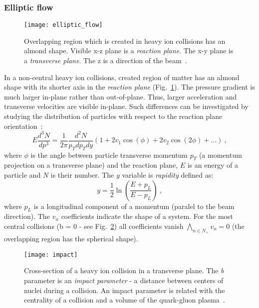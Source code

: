       \subsubsection{Elliptic flow}
        \begin{figure}[b]
          \centering
          \texttt{[image: elliptic\_flow]}
          \caption{Overlapping region which is created in heavy ion collisions has an almond shape. Visible x-z plane is a \textit{reaction plane}. The x-y plane is a \textit{transverse plane}. The z is a direction of the beam~\cite{eflow}.}
          \label{fig:elliptic_flow}
        \end{figure}
        In a non-central heavy ion collisions, created region of matter has an almond shape with its shorter axis in the \textit{reaction plane} (Fig.~\ref{fig:elliptic_flow}).
        The pressure gradient is much larger in-plane rather than out-of-plane.
        Thus, larger acceleration and transverse velocities are visible in-plane.
        Such differences can be investigated by studying the distribution of particles with respect to the reaction plane orientation~\cite{hip}:
        \begin{equation}
          E\frac{d^3 N}{d p^3} = \frac{1}{2\pi} \frac{d^2 N}{p_T d p_T d y} (1 + 2 v_1 \cos(\phi) + 2 v_2 \cos(2 \phi) + ...)~,
          \label{eq:elliptic_flow}
        \end{equation}
        where $\phi$ is the angle between particle transverse momentum $p_T$ (a momentum projection on a transverse plane) and the reaction plane, $E$ is an energy of a particle and $N$ is their number.
        The $y$ variable is \textit{rapidity} defined as:
        \begin{equation}
          y = \frac{1}{2} \ln \left( \frac{E+ p_L}{E - p_L} \right)~,
        \end{equation}
        where $p_L$ is a longitudinal component of a momentum (paralel to the beam direction).
        The $v_n$ coefficients indicate the shape of a system.
        For the most central collisions (b = 0 - see Fig.~\ref{fig:impact_parameter}) all coefficients vanish $\bigwedge_{n \in N_{+}} v_n = 0$ (the overlapping region has the spherical shape).
        \begin{figure}[b]
          \centering
          \texttt{[image: impact]}
          \caption{Cross-section of a heavy ion collision in a transverse plane. 
          The \textit{b} parameter is an \textit{impact parameter} - a distance between centers of nuclei during a collision. An impact parameter is related with the centrality of a collision and a volume of the quark-gluon plasma~\cite{hip}.}
          \label{fig:impact_parameter}
        \end{figure}
